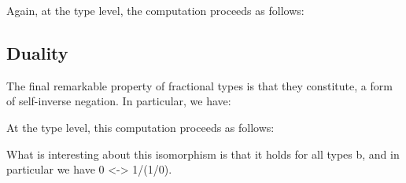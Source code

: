 \documentclass{llncs}
\begin{document}
\noindent Again, at the type level, the computation proceeds as follows:


\subsection{Duality}

The final remarkable property of fractional types is that they
constitute, a form of self-inverse negation. In particular, we have:


\noindent At the type level, this computation proceeds as follows:


What is interesting about this isomorphism is that it holds for all
types {{b}}, and in particular we have {{0 <-> 1/(1/0)}}.




 

\end{document}
